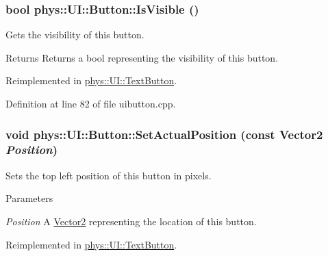 \hypertarget{classphys_1_1UI_1_1Button_a2bca8ace690157fa2646bcf1cb54397a}{
\subsubsection[{IsVisible}]{\setlength{\rightskip}{0pt plus 5cm}bool phys::UI::Button::IsVisible ()}}
\label{d8/d88/classphys_1_1UI_1_1Button_a2bca8ace690157fa2646bcf1cb54397a}


Gets the visibility of this button. 

\begin{DoxyReturn}{Returns}
Returns a bool representing the visibility of this button. 
\end{DoxyReturn}


Reimplemented in \hyperlink{classphys_1_1UI_1_1TextButton_a505167a00d343d704df1f759cd12ed1e}{phys::UI::TextButton}.



Definition at line 82 of file uibutton.cpp.

\hypertarget{classphys_1_1UI_1_1Button_ad5ad1d5f72f52750c3211e7b812237a8}{
\subsubsection[{SetActualPosition}]{\setlength{\rightskip}{0pt plus 5cm}void phys::UI::Button::SetActualPosition (const {\bf Vector2} {\em Position})}}
\label{d8/d88/classphys_1_1UI_1_1Button_ad5ad1d5f72f52750c3211e7b812237a8}


Sets the top left position of this button in pixels. 


\begin{DoxyParams}{Parameters}
\item[{\em Position}]A \hyperlink{classphys_1_1Vector2}{Vector2} representing the location of this button. \end{DoxyParams}


Reimplemented in \hyperlink{classphys_1_1UI_1_1TextButton_a717a2a7fdcf625e833764381989c4b56}{phys::UI::TextButton}.



